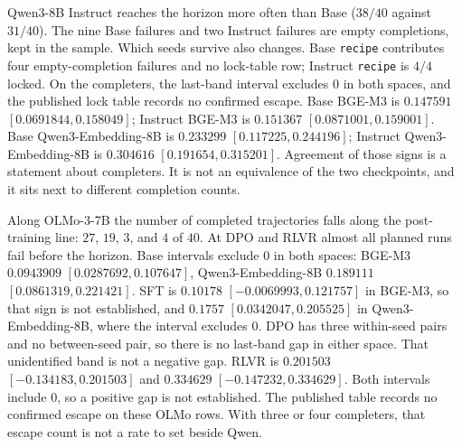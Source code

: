 \documentclass[10pt]{article}
\begin{document}
Qwen3-8B Instruct reaches the horizon more often than Base ($38/40$
against $31/40$). %
The nine Base failures and two Instruct failures are empty completions,
kept in the sample. %
Which seeds survive also changes.
Base \texttt{recipe} contributes four empty-completion failures and no
lock-table row; Instruct \texttt{recipe} is $4/4$ locked. %
On the completers, the last-band interval excludes $0$ in both spaces,
and the published lock table records no confirmed escape.
Base BGE-M3 is $0.147591$ $[0.0691844, 0.158049]$; %
Instruct BGE-M3 is $0.151367$ $[0.0871001, 0.159001]$. %
Base Qwen3-Embedding-8B is $0.233299$ $[0.117225, 0.244196]$; %
Instruct Qwen3-Embedding-8B is $0.304616$ $[0.191654, 0.315201]$. %
Agreement of those signs is a statement about completers.
It is not an equivalence of the two checkpoints, and it sits next to
different completion counts.

Along OLMo-3-7B the number of completed trajectories falls along the
post-training line: $27$, $19$, $3$, and $4$ of $40$. %
At DPO and RLVR almost all planned runs fail before the horizon.
Base intervals exclude $0$ in both spaces:
BGE-M3 $0.0943909$ $[0.0287692, 0.107647]$, %
Qwen3-Embedding-8B $0.189111$ $[0.0861319, 0.221421]$. %
SFT is $0.10178$ $[-0.0069993, 0.121757]$ in BGE-M3, so that sign is
not established, and $0.1757$ $[0.0342047, 0.205525]$ in
Qwen3-Embedding-8B, where the interval excludes $0$. %
DPO has three within-seed pairs and no between-seed pair, so there is
no last-band gap in either space. %
That unidentified band is not a negative gap.
RLVR is $0.201503$ $[-0.134183, 0.201503]$ and
$0.334629$ $[-0.147232, 0.334629]$. %
Both intervals include $0$, so a positive gap is not established.
The published table records no confirmed escape on these OLMo rows.
With three or four completers, that escape count is not a rate to set
beside Qwen.
\end{document}
